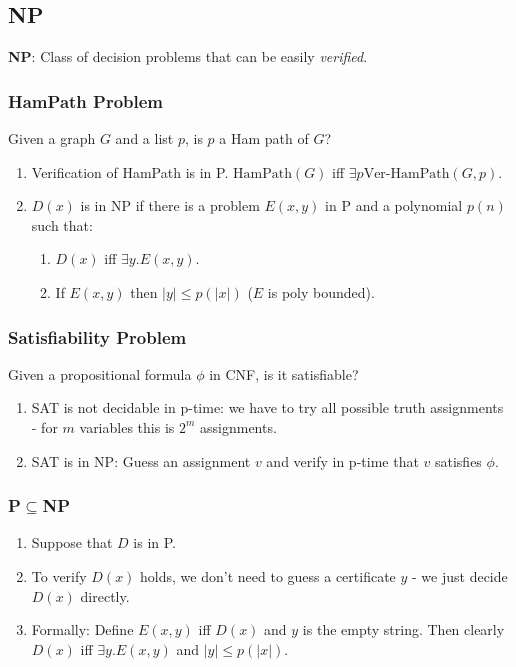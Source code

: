 \documentclass[twocolumn,english]{article}
\begin{document}
\subsection{NP}

\textbf{NP}: Class of decision problems that can be easily \emph{verified}.


\subsubsection{HamPath Problem}

Given a graph $G$ and a list $p$, is $p$ a Ham path of $G$?
\begin{enumerate}
\item Verification of HamPath is in P. $\mbox{HamPath}\left(G\right)$ iff
$\exists p\mbox{Ver-HamPath}\left(G,p\right)$.
\item $D\left(x\right)$ is in NP if there is a problem $E\left(x,y\right)$
in P and a polynomial $p\left(n\right)$ such that:

\begin{enumerate}
\item $D\left(x\right)$ iff $\exists y.E\left(x,y\right)$.
\item If $E\left(x,y\right)$ then $\left|y\right|\leq p\left(\left|x\right|\right)$
($E$ is poly bounded).
\end{enumerate}
\end{enumerate}

\subsubsection{Satisfiability Problem}

Given a propositional formula $\phi$ in CNF, is it satisfiable?
\begin{enumerate}
\item SAT is not decidable in p-time: we have to try all possible truth
assignments - for $m$ variables this is $2^{m}$ assignments.
\item SAT is in NP: Guess an assignment $v$ and verify in p-time that $v$
satisfies $\phi$.
\end{enumerate}

\subsubsection{P$\boldsymbol{\subseteq}$NP}
\begin{enumerate}
\item Suppose that $D$ is in P.
\item To verify $D\left(x\right)$ holds, we don't need to guess a certificate
$y$ - we just decide $D\left(x\right)$ directly.
\item Formally: Define $E\left(x,y\right)$ iff $D(x)$ and $y$ is the
empty string. Then clearly $D\left(x\right)$ iff $\exists y.E\left(x,y\right)$
and $\left|y\right|\leq p\left(\left|x\right|\right)$.
\end{enumerate}
\end{document}
